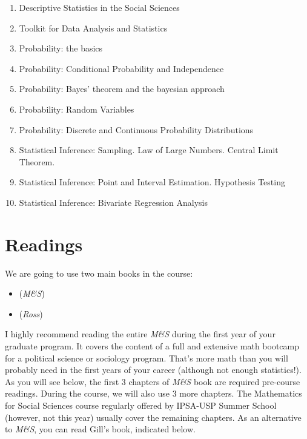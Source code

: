 \documentclass[a4paper,11pt]{article}
\begin{document}
	\begin{enumerate}
        \item Descriptive Statistics in the Social Sciences
        \item Toolkit for Data Analysis and Statistics
        \item Probability: the basics
        \item Probability: Conditional Probability and Independence
        \item Probability: Bayes' theorem and the bayesian approach
        \item Probability: Random Variables
        \item Probability: Discrete and Continuous Probability Distributions 
        \item Statistical Inference: Sampling. Law of Large Numbers. Central Limit Theorem.  
        \item Statistical Inference: Point and Interval Estimation. Hypothesis Testing
        \item Statistical Inference: Bivariate Regression Analysis
    \end{enumerate}

\section{Readings}

We are going to use two main books in the course:

\begin{itemize}
	\item (\emph{M\&S}) 
	\item (\emph{Ross}) 
\end{itemize}

I highly recommend reading the entire \emph{M\&S} during the first year of your graduate program. It covers the content of a full and extensive math bootcamp for a political science or sociology program. That's more math than you will probably need in the first years of your career (although not enough statistics!). As you will see below, the first 3 chapters of \emph{M\&S} book are required pre-course readings. During the course, we will also use 3 more chapters. The Mathematics for Social Sciences course regularly offered by IPSA-USP Summer School (however, not this year) usually cover the remaining chapters. As an alternative to \emph{M\&S}, you can read Gill's book, indicated below.
\end{document}
